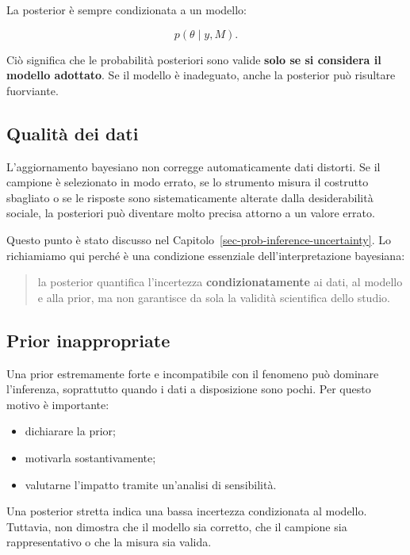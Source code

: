 \documentclass[
  italian,
  letterpaper,
  a4paper,
  11pt,
  open=any]{scrbook}
\providecommand{\tightlist}{%
  \setlength{\itemsep}{0pt}\setlength{\parskip}{0pt}}
\theoremstyle{plain}
\theoremstyle{definition}
\theoremstyle{definition}
\theoremstyle{remark}
\begin{document}
La posterior è sempre condizionata a un modello:

\[
p(\theta \mid y, M).
\]

Ciò significa che le probabilità posteriori sono valide \textbf{solo se
si considera il modello adottato}. Se il modello è inadeguato, anche la
posterior può risultare fuorviante.

\subsection{Qualità dei dati}\label{qualituxe0-dei-dati}

L'aggiornamento bayesiano non corregge automaticamente dati distorti. Se
il campione è selezionato in modo errato, se lo strumento misura il
costrutto sbagliato o se le risposte sono sistematicamente alterate
dalla desiderabilità sociale, la posteriori può diventare molto precisa
attorno a un valore errato.

Questo punto è stato discusso nel
Capitolo~\ref{sec-prob-inference-uncertainty}. Lo richiamiamo qui perché
è una condizione essenziale dell'interpretazione bayesiana:

\begin{quote}
la posterior quantifica l'incertezza \textbf{condizionatamente} ai dati,
al modello e alla prior, ma non garantisce da sola la validità
scientifica dello studio.
\end{quote}

\subsection{Prior inappropriate}\label{prior-inappropriate}

Una prior estremamente forte e incompatibile con il fenomeno può
dominare l'inferenza, soprattutto quando i dati a disposizione sono
pochi. Per questo motivo è importante:

\begin{itemize}
\tightlist
\item
  dichiarare la prior;
\item
  motivarla sostantivamente;
\item
  valutarne l'impatto tramite un'analisi di sensibilità.
\end{itemize}

\begin{tcolorbox}[enhanced jigsaw, arc=.35mm, bottomrule=.15mm, bottomtitle=1mm, breakable, colback=white, colbacktitle=quarto-callout-warning-color!10!white, colframe=quarto-callout-warning-color-frame, coltitle=black, left=2mm, leftrule=.75mm, opacityback=0, opacitybacktitle=0.6, rightrule=.15mm, title=\textcolor{quarto-callout-warning-color}{\faExclamationTriangle}\hspace{0.5em}{Una posterior precisa non basta}, titlerule=0mm, toprule=.15mm, toptitle=1mm]

Una posterior stretta indica una bassa incertezza condizionata al
modello. Tuttavia, non dimostra che il modello sia corretto, che il
campione sia rappresentativo o che la misura sia valida.

\end{tcolorbox}
\end{document}
